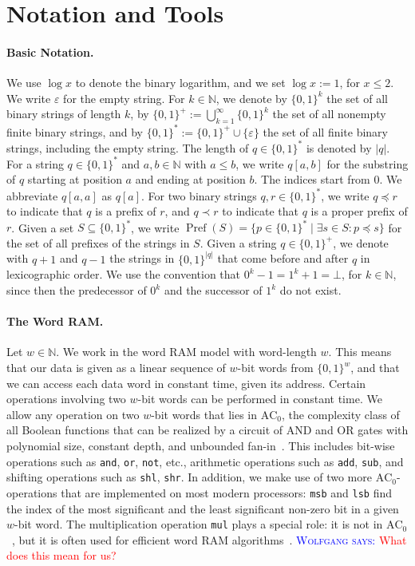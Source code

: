 \documentclass[a4paper,11pt]{article}
\newcommand{\eps}{\varepsilon}
\newcommand{\N}{\mathbb{N}}
\newcommand{\?}{\mskip1.5mu}
\DeclareMathOperator{\Pref}{Pref}
\newcommand{\aremark}[3]{\textcolor{blue}{\textsc{#1 #2:}}
  \textcolor{red}{\textsf{#3}}}
\newcommand{\wolfgang}[2][says]{\aremark{Wolfgang}{#1}{#2}}
\begin{document}
\section{Notation and Tools}
\label{sec:notation}

\paragraph{Basic Notation.}
We use $\log x$ to denote the binary logarithm, and we set 
$\log x := 1$, for $x \leq 2$.
We write $\eps$ for the empty string. For $k \in \N$, we denote by 
$\{0, 1\}^k$ the set of all binary strings of length $k$, by 
$\{0,1\}^+ := \bigcup_{k = 1}^{\infty} \{0, 1\}^k$ the set of all
nonempty finite binary strings, and by 
$\{0,1\}^* := \{0, 1\}^+ \cup \{\eps\}$ the set of all finite binary 
strings, including the empty string. 
The length of $q \in \{0, 1\}^*$ is denoted by $|q|$.
For a string $q \in \{0, 1\}^*$ and $a, b \in \N$ with $a \leq b$, 
we write $q[a, b]$ for the substring of $q$ starting at position
$a$ and ending at position $b$.  The indices start from $0$. 
We abbreviate $q[a, a]$ as $q[a]$. For two binary strings 
$q, r \in \{0,1\}^*$, we write $q \preceq r$ to indicate that $q$ is 
a prefix of $r$, and $q \prec r$ to indicate that $q$ is a proper 
prefix of $r$. 
Given a set $S \subseteq \{0, 1\}^*$, we write 
$\Pref(S) = \{p \in \{0, 1\}^* \mid \exists s \in S: p \preceq s\}$
for the set of all prefixes of the strings in $S$.
Given a string 
$q \in \{0,1\}^+$, we denote with $q + 1$ and $q - 1$ the strings in 
$\{0, 1\}^{|q|}$ that come before and after $q$ in lexicographic 
order. We use the convention that $0^k - 1 = 1^k + 1 = \bot$, for 
$k \in \N$, since then the predecessor of $0^k$ and the successor
of $1^k$ do not exist. 

\paragraph{The Word RAM.}
Let $w \in \N$. We work in the word RAM 
model with word-length $w$. This means that our data is given
as a linear sequence of $w$-bit words from $\{0, 1\}^w$, 
and that we can access each
data word in constant time, given its address. 
Certain operations involving two $w$-bit words
can be performed in constant time.
We allow any operation on two $w$-bit
words that lies in $\text{AC}_0$, the complexity class of
all Boolean functions that can be realized by a 
circuit of AND and OR gates with polynomial size, constant depth,
and unbounded fan-in~\cite{AroraBa09}.
This includes
bit-wise operations such as \texttt{and}, \texttt{or}, 
\texttt{not}, etc., arithmetic operations
such as \texttt{add}, \texttt{sub}, and
shifting operations such as \texttt{shl}, \texttt{shr}.
In addition, we make use of two more $\text{AC}_0$-operations that are 
implemented on most modern processors:
\texttt{msb} and \texttt{lsb} find the index of the
most significant and the least significant non-zero bit
in a given $w$-bit word.
The multiplication operation \texttt{mul} plays a special
role: it is not in $\text{AC}_0$~\cite{FurstSaSi84}, but it is often used
for efficient word RAM algorithms~\cite{FredmanWi93}.
\wolfgang{What does this mean for us?}
\end{document}
